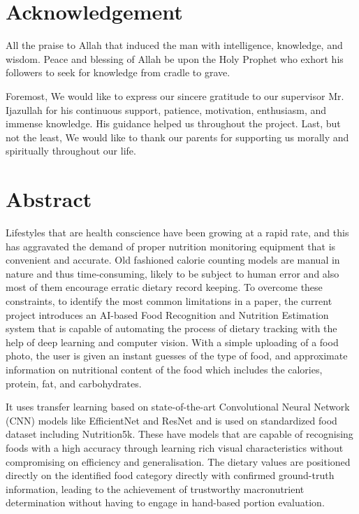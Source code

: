 \documentclass[12pt, openany]{report}
\begin{document}
\chapter*{\centering Acknowledgement}
All the praise to Allah that induced the man with intelligence, knowledge, and wisdom. Peace and blessing of Allah be upon the Holy Prophet who exhort his followers to seek for knowledge from cradle to grave.

Foremost, We would like to express our sincere gratitude to our supervisor Mr. Ijazullah for his continuous support, patience, motivation, enthusiasm, and immense knowledge. His guidance helped us throughout the project.
Last, but not the least, We would like to thank our parents for supporting us morally and spiritually throughout our life. 
 


\chapter*{\centering Abstract}
Lifestyles that are health conscience have been growing at a rapid rate, and this has aggravated the demand of proper nutrition monitoring equipment that is convenient and accurate. Old fashioned calorie counting models are manual in nature and thus time-consuming, likely to be subject to human error and also most of them encourage erratic dietary record keeping. To overcome these constraints, to identify the most common limitations in a paper, the current project introduces an AI-based Food Recognition and Nutrition Estimation system that is capable of automating the process of dietary tracking with the help of deep learning and computer vision. With a simple uploading of a food photo, the user is given an instant guesses of the type of food, and approximate information on nutritional content of the food which includes the calories, protein, fat, and carbohydrates.

It uses transfer learning based on state-of-the-art Convolutional Neural Network (CNN) models like EfficientNet and ResNet and is used on standardized food dataset including Nutrition5k. These have models that are capable of recognising foods with a high accuracy through learning rich visual characteristics without compromising on efficiency and generalisation. The dietary values are positioned directly on the identified food category directly with confirmed ground-truth information, leading to the achievement of trustworthy macronutrient determination without having to engage in hand-based portion evaluation.
\end{document}
